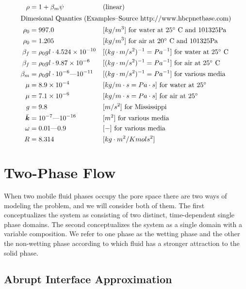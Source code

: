 \documentclass[10pt,dvips,twoside,reqno]{amsart}
\begin{document}
\begin{center}
{\begin{minipage}[b]{6.5in}
\begin{align}
\rho &= 1 + \beta_m \psi &&\mbox{(linear)}\\
\intertext{Dimesional Quanties (Examples--Source http://www.hbcpnetbase.com)}
\rho_0 &= 997.0 && [kg/m^3] \mbox{ for water at $25^\circ$ C and 101325Pa}\\
\rho_0 &= 1.205 && [kg/m^3] \mbox{ for air at $20^\circ$ C and 101325Pa}\\
\beta_f &= \rho_0 g l \cdot 4.524\times10^{-10} &&[(kg \cdot m /s^2)^{-1} = Pa^{-1}]  \mbox{ for water at $25^\circ$ C}\\
\beta_f &= \rho_0 g l \cdot9.87\times10^{-6} &&[(kg \cdot m /s^2)^{-1} = Pa^{-1}]  \mbox{ for air at $25^\circ$ C}\\
\beta_m &= \rho_0 g l \cdot 10^{-6} \mbox{---} 10^{-11} &&[(kg \cdot m /s^2)^{-1} = Pa^{-1}]  \mbox{ for various media}\\
\mu &= 8.9\times 10^{-4} && [kg / m \cdot s = Pa \cdot s] \mbox{ for water at $25^\circ$} \\
\mu &= 7.1\times 10^{-6} && [kg / m \cdot s = Pa \cdot s] \mbox{ for air at $25^\circ$} \\
g &= 9.8 && [m/s^2] \mbox{ for Mississippi} \\
\bar{\mbox{{\boldmath ${k}$}}}&= 10^{-7}\mbox{---}10^{-16} && [m^2] \mbox{ for various media}\\
\omega&=0.01\mbox{---}0.9 && [-] \mbox{ for various media} \\ 
R&=8.314 &&[kg \cdot m^2 / K mol s^2]
\end{align}
\end{minipage}}
\end{center}

\section{Two-Phase Flow}

When two mobile fluid phases occupy the pore space there are two ways
of modeling the problem, and we will consider both of them. The first
conceptualizes the system as consisting of two distinct,
time-dependent single phase domains. The second conceptualizes the
system as a single domain with a variable composition. We refer to one
phase as the wetting phase and the other the non-wetting phase according
to which fluid has a stronger attraction to the solid phase.

\subsection{Abrupt Interface Approximation}
\end{document}
